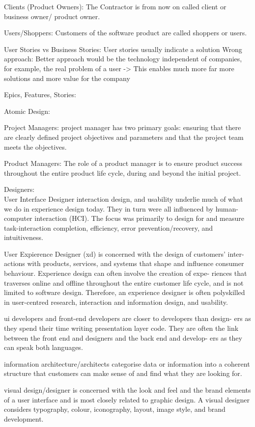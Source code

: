 Clients (Product Owners):
The Contractor is from now on called client or business owner/ product owner.

Users/Shoppers:
Customers of the software product are called shoppers or users.

User Stories vs Business Stories:
User stories usually indicate a solution
Wrong approach:
Better approach would be the technology independent of companies, for example, the real problem of a user -> This enables much more far more solutions and more value for the company

Epics, Features, Stories:

Atomic Design:

Project Managers:
project manager has two primary goals: ensuring that there are clearly defined project objectives and parameters and that the project team meets the objectives.

Product Managers:
The role of a product manager is to ensure product success throughout the entire product life cycle, during and beyond the initial project.

Designers:\\
User Interface Designer interaction design, and usability underlie much of what we do in experience design today. They in turn were all influenced by human-computer interaction (HCI). The focus was primarily to design for and measure task-interaction completion, efficiency, error prevention/recovery, and intuitiveness.

User Expierence Designer (xd) is concerned with the design of customers’ inter- actions with products, services, and systems that shape and influence consumer behaviour. Experience design can often involve the creation of expe- riences that traverses online and offline throughout the entire customer life cycle, and is not limited to software design. Therefore, an experience designer is often polyskilled in user-centred research, interaction and information design, and usability.

ui developers and front-end developers are closer to developers than design- ers as they spend their time writing presentation layer code. They are often the link between the front end and designers and the back end and develop- ers as they can speak both languages.

information architecture/architects categorise data or information into a coherent structure that customers can make sense of and find what they are looking for.

visual design/designer is concerned with the look and feel and the brand elements of a user interface and is most closely related to graphic design. A visual designer considers typography, colour, iconography, layout, image style, and brand development.

